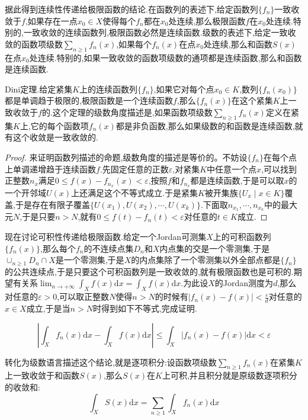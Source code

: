 据此得到连续性传递给极限函数的结论.在函数列的表述下,给定函数列$\{f_n\}$一致收敛于$f$,如果存在一点$x_0\in X$使得每个$f_n$都在$x_0$处连续,那么极限函数$f$在$x_0$处连续.特别的,一致收敛的连续函数列,极限函数必然是连续函数.级数的表述下,给定一致收敛的函数项级数$\sum_{n\ge1}f_n(x)$,如果每个$f_n(x)$在点$x_0$处连续,那么和函数$S(x)$在点$x_0$处连续.特别的,如果一致收敛的函数项级数的通项都是连续函数,那么和函数是连续函数.

Dini定理.给定紧集$K$上的连续函数列$\{f_n\}$,如果它对每个点$x_0\in K$,数列$\{f_n(x_0)\}$都是单调趋于极限的,极限函数是一个连续函数$f$,那么$\{f_n(x)\}$在这个紧集$K$上一致收敛于$f$的.这个定理的级数角度描述是,如果函数项级数$\sum_{n\ge1}f_n(x)$定义在紧集$K$上,它的每个函数项$f_n(x)$都是非负函数,那么如果级数的和函数是连续函数,就有这个收敛是一致收敛的.
\begin{proof}
	
	来证明函数列描述的命题,级数角度的描述是等价的。不妨设$\{f_n\}$在每个点上单调递增趋于连续函数$f$.先固定任意的正数$\varepsilon$,对紧集$K$中任意一个点$x$,可以找到正整数$n_x$满足$0\le f(x)-f_{n_x}(x)<\varepsilon$,按照$f$和$f_{n_x}$都是连续函数,于是可以取$x$的一个开邻域$U(x)$上还满足这个不等式成立.于是紧集$K$被开集族$\{U_x\mid x\in K\}$覆盖,于是存在有限子覆盖$\{U(x_1),U(x_2),\cdots,U(x_k)\}$.下面取$n_{x_1},\cdots,n_{x_k}$中的最大元$N$,于是只要$n>N$,就有$0\le f(t)-f_n(t)<\varepsilon$对任意的$t\in K$成立.
	
\end{proof}

现在讨论可积性传递给极限函数.给定一个Jordan可测集$X$上的可积函数列$\{f_n(x)\}$,那么每个$f_n$的不连续点集$D_n$和$X$内点集的交是一个零测集,于是$\cup_{n\ge1}D_n\cap X$是一个零测集,于是$X$的内点集除了一个零测集以外全部点都是$\{f_n\}$的公共连续点,于是只要这个可积函数列是一致收敛的,就有极限函数也是可积的.期望有关系$\lim_{n\to+\infty}\int_Xf(x)\mathrm{d}x=\int_Xf(x)\mathrm{d}x$.为此设$X$的Jordan测度为$d$,那么对任意的$\varepsilon>0$,可以取正整数$N$使得$n>N$的时候有$|f_n(x)-f(x)|<\frac{\varepsilon}{d}$对任意的$x\in X$成立,于是当$n>N$时得到如下不等式,完成证明.

$$\left|\int_Xf_n(x)\mathrm{d}x-\int_Xf(x)\mathrm{d}x\right|\le\int_X|f_n(x)-f(x)|\mathrm{d}x<\varepsilon$$

转化为级数语言描述这个结论,就是逐项积分:设函数项级数$\sum_{n\ge1}f_n(x)$在紧集$K$上一致收敛于和函数$S(x)$,那么$S(x)$在$K$上可积,并且积分就是原级数逐项积分的收敛和:
$$\int_XS(x)\mathrm{d}x=\sum_{n\ge1}\int_Xf_n(x)\mathrm{d}x$$

